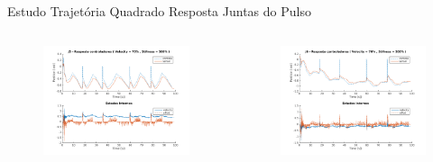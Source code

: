 \documentclass{beamer}
\begin{document}
\begin{frame}{Estudo Trajetória Quadrado}
Resposta Juntas do Pulso
\begin{columns}
\begin{column}{0.5\textwidth}
   \begin{figure}
    \centering
    \includegraphics[width = \linewidth]{tex/figs/squareStiffJ3stateEval_J5v70s500.png}
    \label{fig:mekademo}
\end{figure}
\end{column}
\begin{column}{0.5\textwidth}  %
    \begin{figure}
    \centering
    \includegraphics[width = \linewidth]{tex/figs/squareStiffJ3stateEval_J6v70s500.png}
    \label{fig:mekademo}
\end{figure}
\end{column}
\end{columns}
\end{frame}
\end{document}
